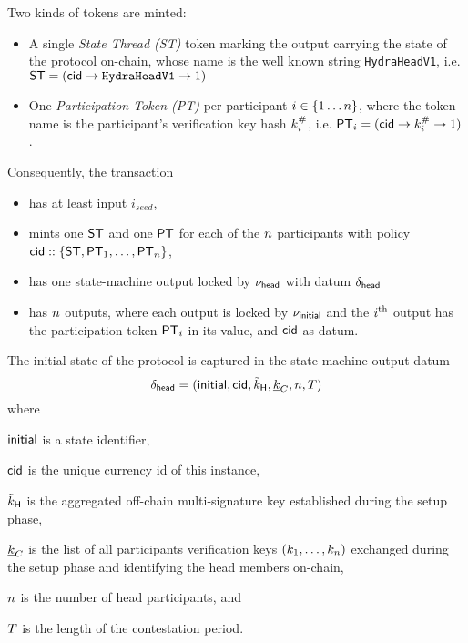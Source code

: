 \vspace{0.1cm}
\noindent Two kinds of tokens are minted:
\begin{itemize}
  \item A single \emph{State Thread (ST)} token marking the output carrying the state
        of the protocol on-chain, whose name is the well known string
        \texttt{HydraHeadV1}, i.e.
        $\mathsf{ST} = (\mathsf{cid} \rightarrow \texttt{HydraHeadV1} \rightarrow 1)$
  \item One \emph{Participation Token (PT)} per participant
        $i \in \{1 \dots n \}$, where the token name is the participant's
        verification key hash $k^{\#}_{i}$, i.e.
        $\mathsf{PT}_{i} = (\mathsf{cid} \rightarrow k^{\#}_{i} \rightarrow 1)$.
\end{itemize}

\noindent Consequently, the \mtxInit{} transaction

\begin{itemize}
  \item has at least input $i_{seed}$,
  \item mints one $\mathsf{ST}$ and one $\mathsf{PT}$ for each of the $n$ participants with
        policy $\mathsf{cid} :: \{\mathsf{ST}, \mathsf{PT}_{1}, \ldots, \mathsf{PT}_{n}\}$,
  \item has one state-machine output locked by $\nu_\mathsf{head}$ with datum
        $\delta_{\mathsf{head}}$
  \item has $n$ outputs, where each output is locked by $\nu_\mathsf{initial}$ and the
        $i^{\text{th}}$ output has the participation token $\mathsf{PT}_i$ in its value, and
        $\mathsf{cid}$ as datum.
\end{itemize}

\noindent The initial state of the protocol is captured in the state-machine output datum
\[
  \delta_{\mathsf{head}} = (\mathsf{initial},\mathsf{cid},\tilde{k}_{\mathsf{H}},\underline{k}_C,n,T)
\]
where
\begin{mitemize}
  \item $\mathsf{initial}$ is a state identifier,
  \item $\mathsf{cid}$ is the unique currency id of this instance,
  \item $\tilde{k}_{\mathsf{H}}$ is the aggregated off-chain multi-signature key established during the
  setup phase,
  \item $\underline{k}_C$ is the list of all participants verification keys
  $(k_1,\ldots,k_n)$ exchanged during the setup phase and identifying the
  head members on-chain,
  \item $n$ is the number of head participants, and
  \item $T$ is the length of the contestation period.
\end{mitemize}

